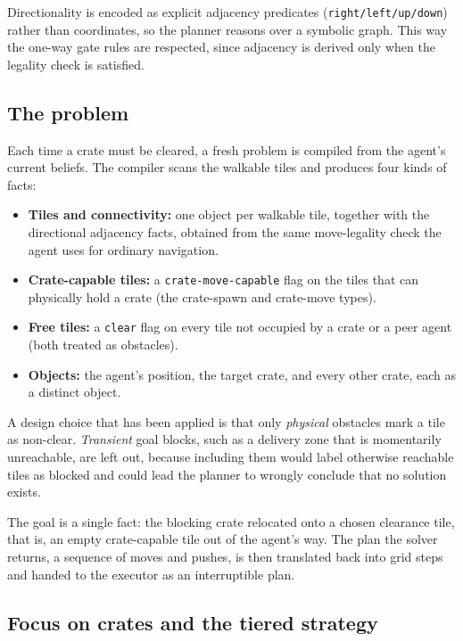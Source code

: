 \documentclass[a4paper,11pt]{article}
\begin{document}
Directionality is encoded as explicit adjacency predicates
(\texttt{right/left/up/down}) rather than coordinates, so the planner reasons over
a symbolic graph. This way the one-way gate rules are respected, since adjacency is derived only
when the legality check is satisfied.

\subsection{The problem}

Each time a crate must be cleared, a fresh problem is compiled from the agent's
current beliefs. The compiler scans the walkable tiles and produces four kinds of
facts:

\begin{itemize}
  \item \textbf{Tiles and connectivity:} one object per walkable tile, together with
        the directional adjacency facts, obtained from the same move-legality check
        the agent uses for ordinary navigation.
  \item \textbf{Crate-capable tiles:} a \texttt{crate-move-capable} flag on the tiles
        that can physically hold a crate (the crate-spawn and crate-move types).
  \item \textbf{Free tiles:} a \texttt{clear} flag on every tile not occupied by a
        crate or a peer agent (both treated as obstacles).
  \item \textbf{Objects:} the agent's position, the target crate, and every other
        crate, each as a distinct object.
\end{itemize}

A design choice that has been applied is that only \emph{physical} obstacles mark a tile
as non-clear. \emph{Transient} goal blocks, such as a delivery zone that is
momentarily unreachable, are left out, because including them would label otherwise
reachable tiles as blocked and could lead the planner to wrongly conclude that no
solution exists.

The goal is a single fact: the blocking crate relocated onto a chosen clearance
tile, that is, an empty crate-capable tile out of the agent's way. The plan the
solver returns, a sequence of moves and pushes, is then translated back into grid
steps and handed to the executor as an interruptible plan.

\subsection{Focus on crates and the tiered strategy}
\end{document}
